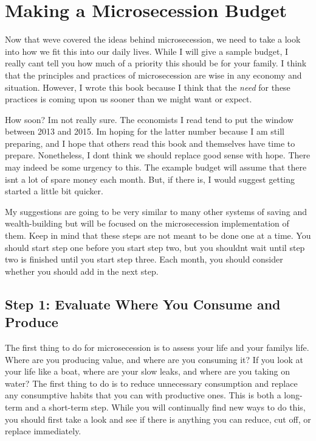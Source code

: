 
\chapter{Making a Microsecession Budget}


Now that we{\textquotesingle}ve covered the ideas behind microsecession,
we need to take a look into how we fit this into our daily lives. While
I will give a sample budget, I really can{\textquotesingle}t tell you
how much of a priority this should be for your family. I think that the
principles and practices of microsecession are wise in any economy and
situation. However, I wrote this book because I think that the
\textit{need} for these practices is coming upon us sooner than we
might want or expect.


How soon?  I{\textquotesingle}m not really sure. The economists I read
tend to put the window between 2013 and 2015. I{\textquotesingle}m
hoping for the latter number because I am still preparing, and I hope
that others read this book and themselves have time to prepare.
Nonetheless, I don{\textquotesingle}t think we should replace good
sense with hope. There may indeed be some urgency to this. The example
budget will assume that there isn{\textquotesingle}t a lot of spare
money each month. But, if there is, I would suggest getting started a
little bit quicker.


My suggestions are going to be very similar to many other systems of
saving and wealth-building but will be focused on the microsecession
implementation of them.
Keep in mind that
these steps are not meant to be done one at a time. You should start
step one before you start step two, but you shouldn{\textquotesingle}t
wait until step two is finished until you start step three. Each month,
you should consider whether you should add in the next step.

\section{Step 1: Evaluate Where You Consume and Produce}

The first thing to do for microsecession is to assess your life and your
family{\textquotesingle}s life. Where are you producing value, and
where are you consuming it?  If you look at your life like a boat,
where are your slow leaks, and where are you taking on water?  The
first thing to do is to reduce unnecessary consumption and replace any
consumptive habits that you can with productive ones. This is both a
long-term and a short-term step. While you will continually find new
ways to do this, you should first take a look and see if there is
anything you can reduce, cut off, or replace immediately.

